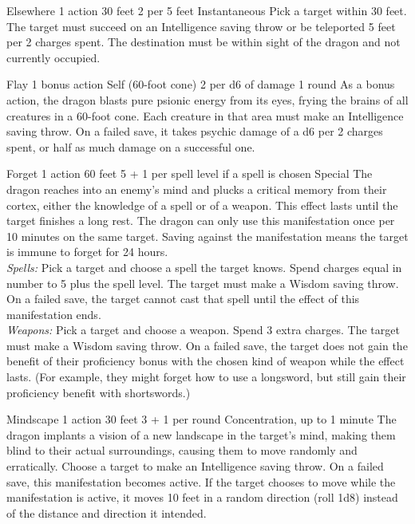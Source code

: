 \documentclass[letterpaper,twocolumn,openany]{dndbook}
\begin{document}
\DndPsiHeader
  {Elsewhere}
  {}
  {1 action}
  {30 feet}
  {2 per 5 feet}
  {Instantaneous}
  Pick a target within 30 feet. The target must succeed on an Intelligence saving throw or be teleported 5 feet per 2 charges spent. The destination must be within sight of the dragon and not currently occupied.

\DndPsiHeader
  {Flay}
  {}
  {1 bonus action}
  {Self (60-foot cone)}
  {2 per d6 of damage}
  {1 round}
  As a bonus action, the dragon blasts pure psionic energy from its eyes, frying the brains of all creatures in a 60-foot cone. Each creature in that area must make an Intelligence saving throw. On a failed save, it takes psychic damage of a d6 per 2 charges spent, or half as much damage on a successful one.

\DndPsiHeader
  {Forget}
  {}
  {1 action}
  {60 feet}
  {5 + 1 per spell level if a spell is chosen}
  {Special}
  The dragon reaches into an enemy’s mind and plucks a critical memory from their cortex, either the knowledge of a spell or of a weapon. This effect lasts until the target finishes a long rest. The dragon can only use this manifestation once per 10 minutes on the same target. Saving against the manifestation means the target is immune to forget for 24 hours.\\
  \textit{Spells:} Pick a target and choose a spell the target knows. Spend charges equal in number to 5 plus the spell level. The target must make a Wisdom saving throw. On a failed save, the target cannot cast that spell until the effect of this manifestation ends.\\
  \textit{Weapons:} Pick a target and choose a weapon. Spend 3 extra charges. The target must make a Wisdom saving throw. On a failed save, the target does not gain the benefit of their proficiency bonus with the chosen kind of weapon while the effect lasts. (For example, they might forget how to use a longsword, but still gain their proficiency benefit with shortswords.)

\DndPsiHeader
  {Mindscape}
  {}
  {1 action}
  {30 feet}
  {3 + 1 per round}
  {Concentration, up to 1 minute}
  The dragon implants a vision of a new landscape in the target’s mind, making them blind to their actual surroundings, causing them to move randomly and erratically. Choose a target to make an Intelligence saving throw. On a failed save, this manifestation becomes active. If the target chooses to move while the manifestation is active, it moves 10 feet in a random direction (roll 1d8) instead of the distance and direction it intended.
\end{document}
